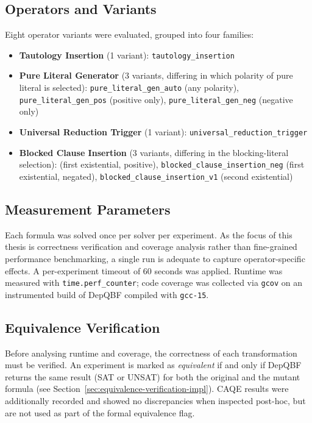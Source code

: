 \subsection{Operators and Variants}\label{sec:operators}

Eight operator variants were evaluated, grouped into four families:
 
\begin{itemize}
  \item \textbf{Tautology Insertion} (1 variant):
        \texttt{tautology\_insertion}
  \item \textbf{Pure Literal Generator} (3 variants, differing in
        which polarity of pure literal is selected):
        \texttt{pure\_literal\_gen\_auto} (any polarity),
        \texttt{pure\_literal\_gen\_pos} (positive only),
        \texttt{pure\_literal\_gen\_neg} (negative only)
  \item \textbf{Universal Reduction Trigger} (1 variant):
        \texttt{universal\_reduction\_trigger}
  \item \textbf{Blocked Clause Insertion} (3 variants, differing in the blocking-literal selection):
        \texttt{} (first existential, positive),
        \texttt{blocked\_clause\_insertion\_neg} (first existential, negated),
        \texttt{blocked\_clause\_insertion\_v1} (second existential)
\end{itemize}

\subsection{Measurement Parameters}\label{sec:measurement}

Each formula was solved once per solver per experiment. As the focus of this 
thesis is correctness verification and coverage analysis rather than fine-grained 
performance benchmarking, a single run is adequate to capture operator-specific 
effects. A per-experiment timeout of 60 seconds was applied. 
Runtime was measured with \texttt{time.perf\_counter}; code coverage was
collected via \texttt{gcov} on an instrumented build of DepQBF compiled
with \texttt{gcc-15}.


\subsection{Equivalence Verification}\label{sec:equivalence-verification}

Before analysing runtime and coverage, the correctness of each transformation
must be verified.
An experiment is marked as \emph{equivalent} if and only if DepQBF returns
the same result (SAT or UNSAT) for both the original and the mutant
formula (see Section~\ref{sec:equivalence-verification-impl}).
CAQE results were additionally recorded and showed no discrepancies when
inspected post-hoc, but are not used as part of the formal equivalence flag.

